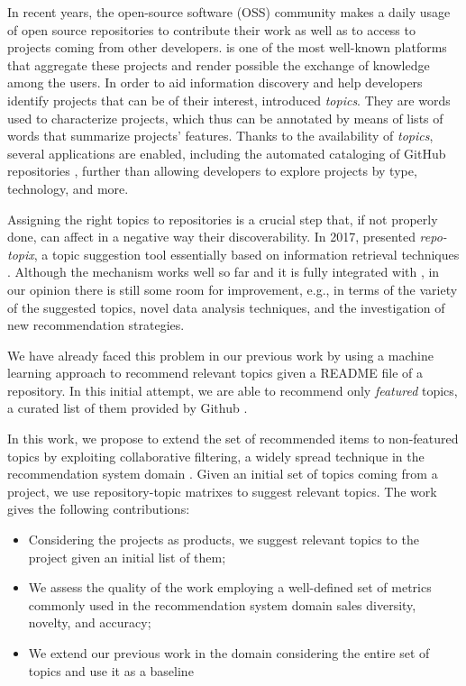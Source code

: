 In recent years, the open-source software (OSS) community
makes a daily usage of open source repositories to
contribute their work as well as to access to projects
coming from other developers. \GH is one of the most
well-known platforms that aggregate these projects and
render possible the exchange of knowledge among the users.
%
In order to aid information discovery and help
developers identify projects that can be of their interest, \GH introduced \emph{topics}. They are
words used to characterize projects, which thus can be
annotated by means of lists of words that summarize projects' features. Thanks
to the availability of \emph{topics}, several applications are enabled,
including the automated cataloging of GitHub repositories \cite{davidlo1},
further than allowing developers to explore projects by type, technology, and
more.

Assigning the right topics to \GH repositories is a crucial step that, if not
properly done, can affect in a negative way their discoverability. In
2017, \GH presented \textit{repo-topix}, a topic suggestion tool essentially
based on information retrieval techniques \cite{noauthor_topic_nodate}.
Although the mechanism works well so far and it is fully integrated with \GH, in our opinion there is still some room for improvement, e.g., in terms of the variety
of the suggested topics, novel data analysis techniques, and the investigation of new recommendation strategies.

We have already faced this problem in our previous work \cite{MNB} by using a machine learning approach to recommend relevant topics given a README file of a repository. In this initial attempt, we are able to recommend only \emph{featured} topics, a curated list of them provided by Github \cite{}.

In this work, we propose to extend the set of recommended items to non-featured topics by exploiting collaborative filtering, a widely spread technique in the recommendation system domain \cite{Schafer:2007:CFR:1768197.1768208}. Given an initial set of topics coming from a \GH project, we use repository-topic matrixes to suggest relevant topics.
The work gives the following contributions:
\begin{itemize}
\item Considering the \GH projects as products, we suggest relevant topics to the project given an initial list of them;
\item We assess the quality of the work employing a well-defined set of metrics commonly used in the recommendation system domain \ie sales diversity, novelty, and accuracy;
\item We extend our previous work in the domain considering the entire set of topics and use it as a baseline
\end{itemize}

